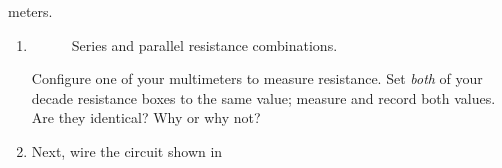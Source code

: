 \documentclass[12pt]{article}
\begin{document}
\begin{enumerate}
  meters. 
  \begin{enumerate}
  \item \label{item:identical}
    \begin{figure}
      \centering
      \qquad {}
      \caption{Series and parallel resistance combinations.}
      \label{fig:resistances}
    \end{figure}
    Configure one of your multimeters to measure resistance.  Set
    \textit{both} of your decade resistance boxes to the same value;
    measure and record both values.  Are they identical?  Why or why
    not?
  \item \label{item:series} Next, wire the circuit shown in

\end{enumerate}
\end{enumerate}
\end{document}
